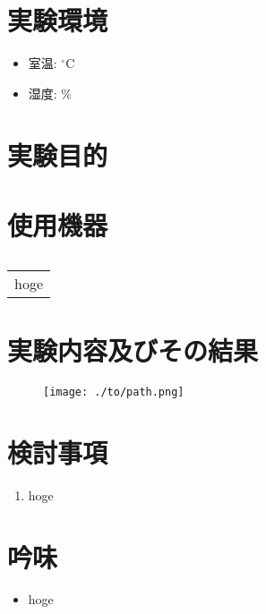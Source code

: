 \documentclass[uplatex, dvipdfmx, a4paper]{ujarticle}
\newcommand{\oC}[0]{\mathrm{^{\circ}C}}
\begin{document}
\section{実験環境}
\begin{itemize}
  \item 室温: $\oC$
  \item 湿度: $\%$
\end{itemize}

\section{実験目的}

\section{使用機器}
\begin{table}[H]
  \caption{}
  \label{tab:machinary}
  \begin{tabular}{|c|} \hline
    hoge \\
  \end{tabular}
\end{table}

\section{実験内容及びその結果}

\begin{figure}[H]
  \texttt{[image: ./to/path.png]}
  \caption{}
  \label{fig:}
\end{figure}

\section{検討事項}
\begin{enumerate}
  \item{hoge}
\end{enumerate}

\section{吟味}
\begin{itemize}
  \item{hoge}
\end{itemize}



\end{document}
